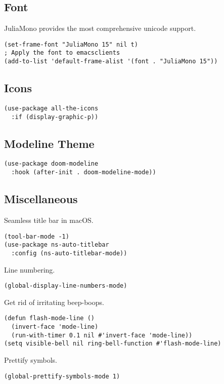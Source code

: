 \documentclass[11pt]{article}
\begin{document}
\subsection{Font}
\label{sec:org092203c}
JuliaMono provides the most comprehensive unicode support.
\begin{verbatim}
(set-frame-font "JuliaMono 15" nil t)
; Apply the font to emacsclients
(add-to-list 'default-frame-alist '(font . "JuliaMono 15"))
\end{verbatim}

\subsection{Icons}
\label{sec:org15fbab5}
\begin{verbatim}
(use-package all-the-icons
  :if (display-graphic-p))
\end{verbatim}

\subsection{Modeline Theme}
\label{sec:orge23971e}
\begin{verbatim}
(use-package doom-modeline
  :hook (after-init . doom-modeline-mode))
\end{verbatim}

\subsection{Miscellaneous}
\label{sec:org90601df}
Seamless title bar in macOS.
\begin{verbatim}
(tool-bar-mode -1)
(use-package ns-auto-titlebar
  :config (ns-auto-titlebar-mode))
\end{verbatim}

Line numbering.
\begin{verbatim}
(global-display-line-numbers-mode)
\end{verbatim}

Get rid of irritating beep-boops.
\begin{verbatim}
(defun flash-mode-line ()
  (invert-face 'mode-line)
  (run-with-timer 0.1 nil #'invert-face 'mode-line))
(setq visible-bell nil ring-bell-function #'flash-mode-line)
\end{verbatim}

Prettify symbols.
\begin{verbatim}
(global-prettify-symbols-mode 1)
\end{verbatim}
\end{document}
